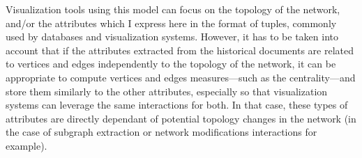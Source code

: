 Visualization tools using this model can focus on the topology of the network, and/or the attributes which I express here in the format of tuples, commonly used by databases and visualization systems\cite{stoltePolarisSystemQuery2002}.
However, it has to be taken into account that if the attributes extracted from the historical documents are related to vertices and edges independently to the topology of the network, it can be appropriate to compute vertices and edges measures---such as the centrality---and store them similarly to the other attributes, especially so that visualization systems can leverage the same interactions for both.
In that case, these types of attributes are directly dependant of potential topology changes in the network (in the case of subgraph extraction or network modifications interactions for example).









